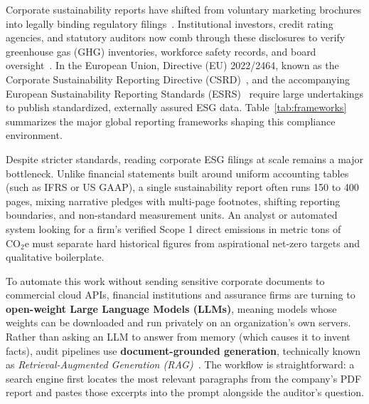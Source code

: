 \documentclass[11pt,letterpaper]{article}
\begin{document}
Corporate sustainability reports have shifted from voluntary marketing brochures into legally binding regulatory filings~\citep{berg2022aggregate,carney2015breaking}. Institutional investors, credit rating agencies, and statutory auditors now comb through these disclosures to verify greenhouse gas (GHG) inventories, workforce safety records, and board oversight~\citep{orsolin2024analysis,rusu2024sustainability}. In the European Union, Directive (EU) 2022/2464, known as the Corporate Sustainability Reporting Directive (CSRD)~\citep{csrd2022}, and the accompanying European Sustainability Reporting Standards (ESRS)~\citep{esrs2023} require large undertakings to publish standardized, externally assured ESG data. Table~\ref{tab:frameworks} summarizes the major global reporting frameworks shaping this compliance environment.



Despite stricter standards, reading corporate ESG filings at scale remains a major bottleneck. Unlike financial statements built around uniform accounting tables (such as IFRS or US GAAP), a single sustainability report often runs 150 to 400 pages, mixing narrative pledges with multi-page footnotes, shifting reporting boundaries, and non-standard measurement units. An analyst or automated system looking for a firm's verified Scope 1 direct emissions in metric tons of $\text{CO}_2\text{e}$ must separate hard historical figures from aspirational net-zero targets and qualitative boilerplate.

To automate this work without sending sensitive corporate documents to commercial cloud APIs, financial institutions and assurance firms are turning to \textbf{open-weight Large Language Models (LLMs)}, meaning models whose weights can be downloaded and run privately on an organization's own servers. Rather than asking an LLM to answer from memory (which causes it to invent facts), audit pipelines use \textbf{document-grounded generation}, technically known as \textit{Retrieval-Augmented Generation (RAG)}~\citep{lewis2020retrieval,gao2023retrieval}. The workflow is straightforward: a search engine first locates the most relevant paragraphs from the company's PDF report and pastes those excerpts into the prompt alongside the auditor's question.
\end{document}
